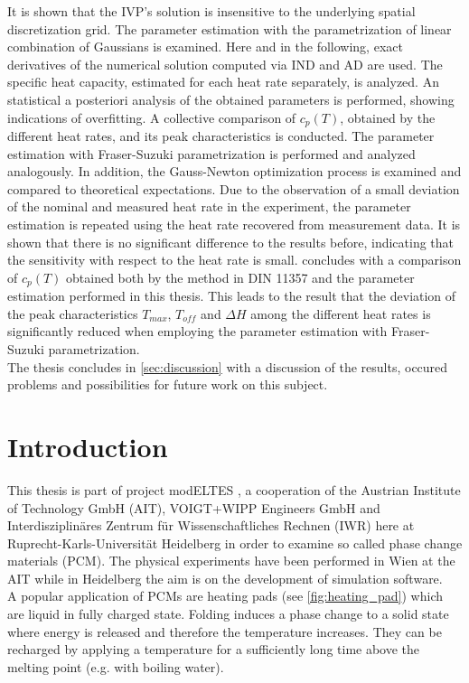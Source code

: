 \documentclass{scrartcl}[12pt, halfparskip]
\numberwithin{equation}{section}
\numberwithin{figure}{section}
\numberwithin{table}{section}
\begin{document}
It is shown that the IVP's solution is insensitive to the underlying spatial discretization grid.
The parameter estimation with the parametrization of linear combination of Gaussians is examined. 
Here and in the following, exact derivatives of the numerical solution computed via IND and AD are used. 
The specific heat capacity, estimated for each heat rate separately, is analyzed. 
An statistical a posteriori analysis of the obtained parameters is performed, showing indications of overfitting. 
A collective comparison of $c_p(T)$, obtained by the different heat rates, and its peak characteristics is conducted. 
The parameter estimation with Fraser-Suzuki parametrization is performed and analyzed analogously. 
In addition, the Gauss-Newton optimization process is examined and compared to theoretical expectations.
Due to the observation of a small deviation of the nominal and measured heat rate in the experiment, the parameter estimation is repeated using the heat rate recovered from measurement data.
It is shown that there is no significant difference to the results before, indicating that the sensitivity with respect to the heat rate is small. 
 concludes with a comparison of $c_p(T)$ obtained both by the method in DIN 11357 and the parameter estimation performed in this thesis. 
This leads to the result that the deviation of the peak characteristics $T_{max}$, $T_{off}$ and $\Delta H$ among the different heat rates is significantly reduced when employing the parameter estimation with Fraser-Suzuki parametrization. \\
The thesis concludes in \cref{sec:discussion} with a discussion of the results, occured problems and possibilities for future work on this subject.


\newpage


\section{Introduction}
\label{sec:introduction}
This thesis is part of project modELTES \cite{modELTES}, a cooperation of the Austrian Institute of Technology GmbH (AIT), VOIGT+WIPP Engineers GmbH and Interdisziplinäres Zentrum für Wissenschaftliches Rechnen (IWR) here at Ruprecht-Karls-Universität Heidelberg in order to examine so called phase change materials (PCM). The physical experiments have been performed in Wien at the AIT while in Heidelberg the aim is on the development of simulation software. \\
A popular application of PCMs are heating pads (see \cref{fig:heating_pad}) which are liquid in fully charged state. Folding induces a phase change to a solid state where energy is released and therefore the temperature increases. They can be recharged by applying a temperature for a sufficiently long time above the melting point (e.g. with boiling water). 
\end{document}
